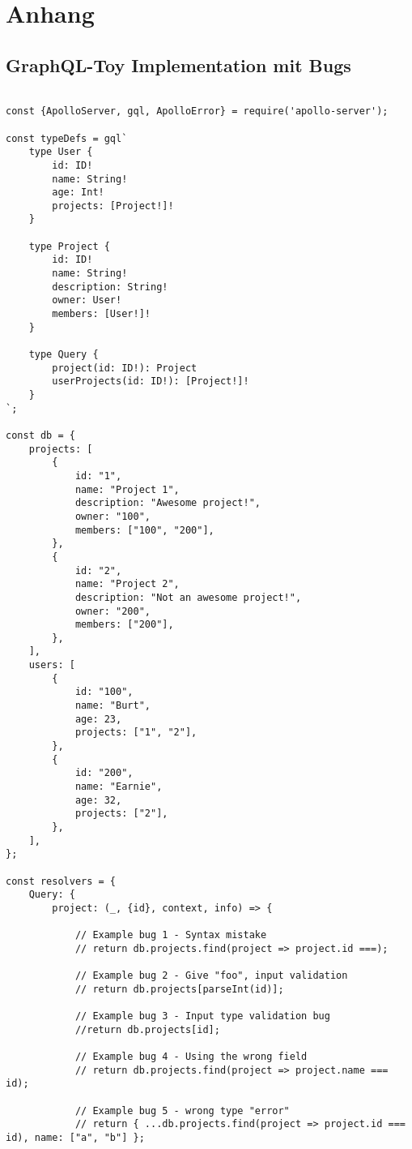 \chapter{Anhang}

\section*{GraphQL-Toy Implementation mit Bugs}
\label{graphql-toy-code}
\begin{lstlisting}

const {ApolloServer, gql, ApolloError} = require('apollo-server');

const typeDefs = gql`
    type User {
        id: ID!
        name: String!
        age: Int!
        projects: [Project!]!
    }

    type Project {
        id: ID!
        name: String!
        description: String!
        owner: User!
        members: [User!]!
    }

    type Query {
        project(id: ID!): Project
        userProjects(id: ID!): [Project!]!
    }
`;

const db = {
    projects: [
        {
            id: "1",
            name: "Project 1",
            description: "Awesome project!",
            owner: "100",
            members: ["100", "200"],
        },
        {
            id: "2",
            name: "Project 2",
            description: "Not an awesome project!",
            owner: "200",
            members: ["200"],
        },
    ],
    users: [
        {
            id: "100",
            name: "Burt",
            age: 23,
            projects: ["1", "2"],
        },
        {
            id: "200",
            name: "Earnie",
            age: 32,
            projects: ["2"],
        },
    ],
};

const resolvers = {
    Query: {
        project: (_, {id}, context, info) => {

            // Example bug 1 - Syntax mistake
            // return db.projects.find(project => project.id ===);

            // Example bug 2 - Give "foo", input validation
            // return db.projects[parseInt(id)];

            // Example bug 3 - Input type validation bug
            //return db.projects[id];

            // Example bug 4 - Using the wrong field
            // return db.projects.find(project => project.name === id);

            // Example bug 5 - wrong type "error"
            // return { ...db.projects.find(project => project.id === id), name: ["a", "b"] };


\end{lstlisting}
